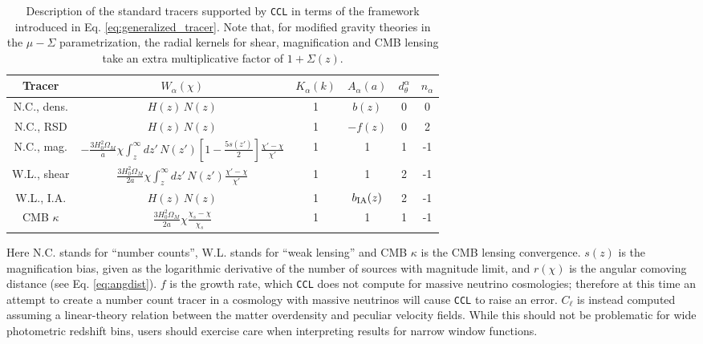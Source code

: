 \documentclass[\docopts]{\docclass}
\newcommand{\ccl}{{\tt CCL}\xspace}
\begin{document}
  \begin{table}[h]
    \centering
    \begin{tabular}{|c|c|c|c|c|c|}
      \hline
      Tracer & \(\displaystyle W_\alpha(\chi) \) & \(\displaystyle K_\alpha(k) \) & \(\displaystyle A_\alpha(a) \) & $d_\theta^\alpha$ & $n_\alpha$ \\
      \hline
      N.C., dens. & \(\displaystyle H(z)\,N(z)\)                                                                                                   & 1        & $b(z)$          & 0 &  0 \\
      N.C., RSD   & \(\displaystyle H(z)\,N(z)\)                                                                                                   & 1        & $-f(z)$         & 0 &  2 \\
      N.C., mag.  & \(\displaystyle -\frac{3H_0^2\Omega_M}{a}\chi\int_z^\infty dz'\,N(z')\left[1-\frac{5s(z')}{2}\right]\frac{\chi'-\chi}{\chi'}\) & 1        & 1               & 1 & -1 \\
      W.L., shear & \(\displaystyle \frac{3H_0^2\Omega_M}{2a}\chi\int_z^\infty dz'\,N(z')\frac{\chi'-\chi}{\chi'}\)                                & 1        & 1               & 2 & -1 \\
      W.L., I.A.  & \(\displaystyle H(z)\,N(z)\)                                                                                                   & 1        & $b_{\rm IA}(z)$ & 2 & -1 \\
      CMB $\kappa$ & \(\displaystyle \frac{3H_0^2\Omega_M}{2a}\chi\frac{\chi_s-\chi}{\chi_s}\)                                                      & 1        & 1               & 1 & -1 \\
      \hline
    \end{tabular}
    \caption{Description of the standard tracers supported by {\tt CCL} in terms of the framework introduced in Eq. \ref{eq:generalized_tracer}. Note that, for modified gravity theories in the $\mu-\Sigma$ parametrization, the radial kernels for shear, magnification and CMB lensing take an extra multiplicative factor of $1+\Sigma(z)$.}
  \end{table}

Here N.C. stands for ``number counts'', W.L. stands for ``weak lensing'' and
CMB $\kappa$ is the CMB lensing convergence. $s(z)$ is the magnification bias,
given as the logarithmic derivative of the number of sources with magnitude
limit, and $r(\chi)$ is the angular comoving distance (see Eq. \ref{eq:angdist}).
$f$ is the growth rate, which \ccl does not compute for massive neutrino cosmologies;
therefore at this time an attempt to create a number count tracer in a cosmology
with massive neutrinos will cause \ccl to raise an error. $C_\ell$ is instead
computed assuming a linear-theory relation between the matter overdensity and
peculiar velocity fields. While this should not be problematic for wide photometric
redshift bins, users should exercise care when interpreting results for narrow
window functions.
\end{document}
